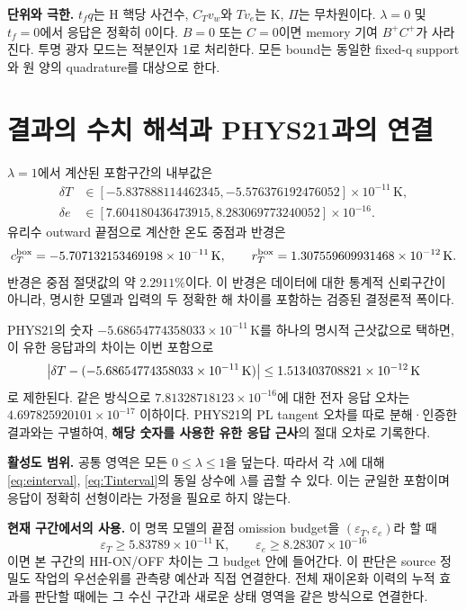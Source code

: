 \documentclass[11pt,a4paper]{article}
\numberwithin{equation}{section}
\begin{document}
\textbf{단위와 극한.} $t_fq$는 H 핵당 사건수, $C_Tv_w$와 $Tv_e$는 K, $\Pi$는 무차원이다. $\lambda=0$ 및 $t_f=0$에서 응답은 정확히 0이다. $B=0$ 또는 $C=0$이면 memory 기여 $B^+C^+$가 사라진다. 투명 광자 모드는 적분인자 1로 처리한다. 모든 bound는 동일한 fixed-q support와 원 양의 quadrature를 대상으로 한다.

\newpage
\section{결과의 수치 해석과 PHYS21과의 연결}
$\lambda=1$에서 계산된 포함구간의 내부값은
\begin{align}
 \delta T&\in[-5.837888114462345,-5.576376192476052]\times10^{-11}\,\mathrm K,\\
 \delta e&\in[7.604180436473915,8.283069773240052]\times10^{-16}.
\end{align}
유리수 outward 끝점으로 계산한 온도 중점과 반경은
\begin{equation}
 c_T^{\rm box}=-5.707132153469198\times10^{-11}\,\mathrm K,\qquad
 r_T^{\rm box}=1.307559609931468\times10^{-12}\,\mathrm K.
\end{equation}
반경은 중점 절댓값의 약 $2.2911\%$이다. 이 반경은 데이터에 대한 통계적 신뢰구간이 아니라, 명시한 모델과 입력의 두 정확한 해 차이를 포함하는 검증된 결정론적 폭이다.

PHYS21의 숫자 $-5.68654774358033\times10^{-11}\,\mathrm K$를 하나의 명시적 근삿값으로 택하면, 이 유한 응답과의 차이는 이번 포함으로
\begin{equation}
 \left|\delta T-(-5.68654774358033\times10^{-11}\,\mathrm K)\right|
 \le1.513403708821\times10^{-12}\,\mathrm K
\end{equation}
로 제한된다. 같은 방식으로 $7.81328718123\times10^{-16}$에 대한 전자 응답 오차는 $4.697825920101\times10^{-17}$ 이하이다. PHYS21의 PL tangent 오차를 따로 분해·인증한 결과와는 구별하여, \textbf{해당 숫자를 사용한 유한 응답 근사}의 절대 오차로 기록한다.

\textbf{활성도 범위.} 공통 영역은 모든 $0\le\lambda\le1$을 덮는다. 따라서 각 $\lambda$에 대해 \eqref{eq:einterval}, \eqref{eq:Tinterval}의 동일 상수에 $\lambda$를 곱할 수 있다. 이는 균일한 포함이며 응답이 정확히 선형이라는 가정을 필요로 하지 않는다.

\textbf{현재 구간에서의 사용.} 이 명목 모델의 끝점 omission budget을 $(\varepsilon_T,\varepsilon_e)$라 할 때
\begin{equation}
 \varepsilon_T\ge5.83789\times10^{-11}\,\mathrm K,\qquad
 \varepsilon_e\ge8.28307\times10^{-16}
\end{equation}
이면 본 구간의 HH-ON/OFF 차이는 그 budget 안에 들어간다. 이 판단은 source 정밀도 작업의 우선순위를 관측량 예산과 직접 연결한다. 전체 재이온화 이력의 누적 효과를 판단할 때에는 그 수신 구간과 새로운 상태 영역을 같은 방식으로 연결한다.
\end{document}
